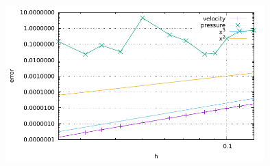 \begin{center}
\includegraphics[width=10cm]{python_codes/fieldstone_saddlepoint_q2q1/errors}
\end{center}
